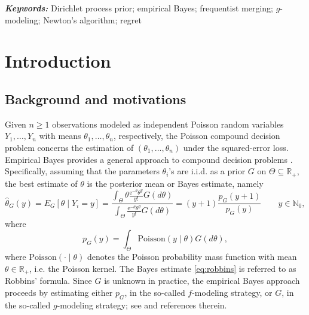 \documentclass[twoside,12pt]{article}
\providecommand{\keywords}[1]
{
  \small	
  \textbf{\textit{Keywords:}} #1
}
\begin{document}
\keywords{Dirichlet process prior; empirical Bayes; frequentist merging; $g$-modeling; Newton's algorithm; regret}


\tableofcontents

\section{Introduction}

\subsection{Background and motivations}

Given $n\geq1$ observations modeled as independent Poisson random variables $Y_{1},\ldots,Y_{n}$ with means $\theta_{1},\ldots,\theta_{n}$, respectively, the Poisson compound decision problem concerns the estimation of $(\theta_{1},\ldots,\theta_{n})$ under the squared-error loss. Empirical Bayes provides a general approach to compound decision problems \citep{Rob(51),Rob(56),Zha(03)}. Specifically, assuming that the parameters $\theta_{i}$'s are i.i.d. as a prior $G$ on $\Theta\subseteq\mathbb{R}_{+}$, the best estimate of $\theta$ is the posterior mean or Bayes estimate, namely
\begin{equation}\label{eq:robbins}
\hat{\theta}_{G}(y)=E_{G}[\theta\mid Y_{i}=y]=\frac{\int_{\Theta}\theta\frac{\text{e}^{-\theta}\theta^{y}}{y!}G(d\theta)}{\int_{\Theta}\frac{\text{e}^{-\theta}\theta^{y}}{y!}G(d\theta)}=(y+1)\frac{p_{G}(y+1)}{p_{G}(y)}\qquad y\in\mathbb{N}_{0},
\end{equation}
where
\begin{displaymath}
p_{G}(y)=\int_\Theta \text{Poisson}(y\mid\theta)G(d\theta),
\end{displaymath}
where $\text{Poisson}(\cdot\mid\theta)$ denotes the Poisson probability mass function with mean $\theta\in\mathbb{R}_{+}$, i.e. the Poisson kernel. The Bayes estimate \eqref{eq:robbins} is referred to as Robbins' formula. Since $G$ is unknown in practice, the empirical Bayes approach proceeds by estimating either $p_G$, in the so-called \(f\)-modeling strategy, or $G$, in the so-called $g$-modeling strategy; see \citet{Efr(14),Efr(19)} and references therein.
\end{document}
